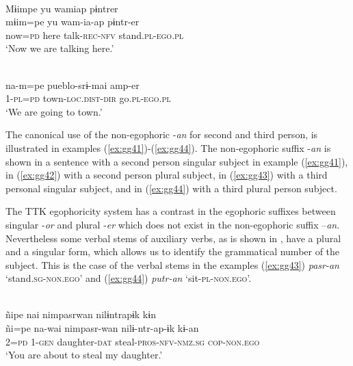 \documentclass[output=paper]{langsci/langscibook}
\begin{document}

\ea \label{ex:gg38}
\\
    \glll Mɨimpe	yu	wamiap	pɨntrer\\
    mɨim=pe	yu	wam-ia-ap	pɨntr-er\\
         now=\textsc{pd}	here	talk-\textsc{rec-nfv}	stand.\textsc{pl-ego.pl}\\
    \glt ‘Now we are talking here.'
\z

\ea \label{ex:gg39}
\\
    \gll na-m=pe	pueblo-srɨ-mai	amp-er\\
         1-\textsc{pl=pd}	town-\textsc{loc.dist-dir}	go.\textsc{pl-ego.pl}\\
    \glt ‘We are going to town.'
\z

The canonical use of the non-egophoric -\textit{an} for second and third person, is illustrated in examples (\ref{ex:gg41})-(\ref{ex:gg44}). The non-egophoric suffix -\textit{an} is shown in a sentence with a second person singular subject in example (\ref{ex:gg41}), in (\ref{ex:gg42}) with a second person plural subject, in (\ref{ex:gg43}) with a third personal singular subject, and in (\ref{ex:gg44}) with a third plural person subject. 

The TTK egophoricity system has a contrast in the egophoric suffixes between singular -\textit{or} and plural -\textit{er} which does not exist in the non-egophoric suffix –\textit{an}. Nevertheless some verbal stems of auxiliary verbs, as is shown in , have a plural and a singular form, which allows us to identify the grammatical number of the subject. This is the case of the verbal stems in the examples (\ref{ex:gg43}) \textit{pasr-an} ‘stand.\textsc{sg-non.ego}’ and (\ref{ex:gg44}) \textit{putr-an} ‘sit-\textsc{pl-non.ego}’.


\ea \label{ex:gg41}
\\
    \glll ñipe	nai	nimpasrwan	nilɨntrapɨk	kɨn\\
    ñi=pe	na-wai	nimpasr-wan	nilɨ-ntr-ap-ɨk	kɨ-an\\
         2=\textsc{pd}	1-\textsc{gen}	daughter-\textsc{dat }	steal-\textsc{pros-nfv-nmz.sg}	\textsc{cop-non.ego}\\
    \glt ‘You are about to steal my daughter.'
\z

\end{document}
